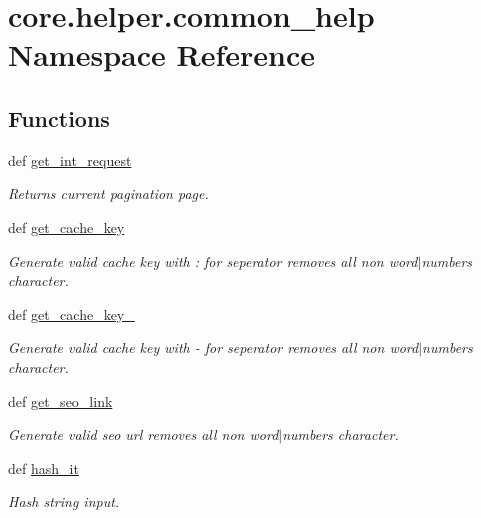 \hypertarget{namespacecore_1_1helper_1_1common__help}{\section{core.\-helper.\-common\-\_\-help Namespace Reference}
\label{namespacecore_1_1helper_1_1common__help}
}
\subsection*{Functions}
\begin{DoxyCompactItemize}
\item 
def \hyperlink{namespacecore_1_1helper_1_1common__help_a3c83839e5bf7a43ae06acdcecee2a0a8}{get\-\_\-int\-\_\-request}
\begin{DoxyCompactList}\small\item\em Returns current pagination page. \end{DoxyCompactList}\item 
def \hyperlink{namespacecore_1_1helper_1_1common__help_a39e90824f021e66201b243813a695066}{get\-\_\-cache\-\_\-key}
\begin{DoxyCompactList}\small\item\em Generate valid cache key with \-: for seperator removes all non word$|$numbers character. \end{DoxyCompactList}\item 
def \hyperlink{namespacecore_1_1helper_1_1common__help_a0b28113a60202caef28ef800e56b3ff2}{get\-\_\-cache\-\_\-key\-\_}
\begin{DoxyCompactList}\small\item\em Generate valid cache key with -\/ for seperator removes all non word$|$numbers character. \end{DoxyCompactList}\item 
def \hyperlink{namespacecore_1_1helper_1_1common__help_ab34c776bf199b0063091690c92975803}{get\-\_\-seo\-\_\-link}
\begin{DoxyCompactList}\small\item\em Generate valid seo url removes all non word$|$numbers character. \end{DoxyCompactList}\item 
def \hyperlink{namespacecore_1_1helper_1_1common__help_ad99df98748fcc7cd6a41e2787d5be59b}{hash\-\_\-it}
\begin{DoxyCompactList}\small\item\em Hash string input. \end{DoxyCompactList}\item 

\end{DoxyCompactItemize}
